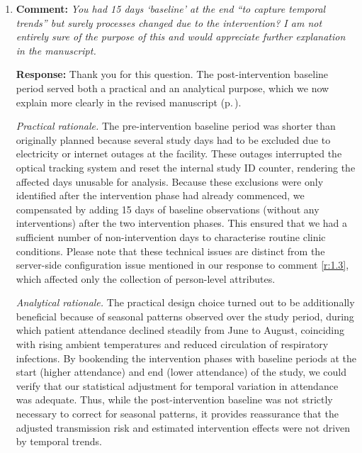 \documentclass[11pt]{article}
\newcommand{\comment}[1]{\textbf{Comment:} \textit{#1}}
\newcommand{\response}[1]{\textbf{Response:} #1}
\begin{document}
\begin{enumerate}[label=\textbf{R1.\arabic*.}, leftmargin=*]
\item\label{r:1.2} \comment{You had 15 days `baseline' at the end ``to capture temporal trends'' but surely processes changed due to the intervention? I am not entirely sure of the purpose of this and would appreciate further explanation in the manuscript.}

\response{Thank you for this question. The post-intervention baseline period served both a practical and an analytical purpose, which we now explain more clearly in the revised manuscript (p.\,\pageref{chg:R1.2}).

\textit{Practical rationale.} The pre-intervention baseline period was shorter than originally planned because several study days had to be excluded due to electricity or internet outages at the facility. These outages interrupted the optical tracking system and reset the internal study ID counter, rendering the affected days unusable for analysis. Because these exclusions were only identified after the intervention phase had already commenced, we compensated by adding 15 days of baseline observations (without any interventions) after the two intervention phases. This ensured that we had a sufficient number of non-intervention days to characterise routine clinic conditions. Please note that these technical issues are distinct from the server-side configuration issue mentioned in our response to comment \ref{r:1.3}, which affected only the collection of person-level attributes. 

\textit{Analytical rationale.} The practical design choice turned out to be additionally beneficial because of seasonal patterns observed over the study period, during which patient attendance declined steadily from June to August, coinciding with rising ambient temperatures and reduced circulation of respiratory infections. By bookending the intervention phases with baseline periods at the start (higher attendance) and end (lower attendance) of the study, we could verify that our statistical adjustment for temporal variation in attendance was adequate. Thus, while the post-intervention baseline was not strictly necessary to correct for seasonal patterns, it provides reassurance that the adjusted transmission risk and estimated intervention effects were not driven by temporal trends.

}
\end{enumerate}
\end{document}
